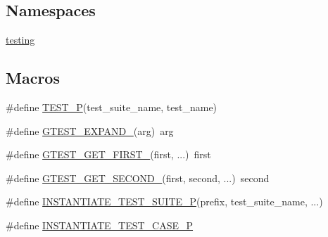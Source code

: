 \subsection*{Namespaces}
\begin{DoxyCompactItemize}
\item 
 \hyperlink{namespacetesting}{testing}
\end{DoxyCompactItemize}
\subsection*{Macros}
\begin{DoxyCompactItemize}
\item 
\#define \hyperlink{gtest-param-test_8h_a1adc861b311e3fbd97bcc72e0b0f5962}{T\+E\+S\+T\+\_\+P}(test\+\_\+suite\+\_\+name,  test\+\_\+name)
\item 
\#define \hyperlink{gtest-param-test_8h_a6442d82c72586da9df3fcfb6d5c80a74}{G\+T\+E\+S\+T\+\_\+\+E\+X\+P\+A\+N\+D\+\_\+}(arg)~arg
\item 
\#define \hyperlink{gtest-param-test_8h_a89cbdb4deb20f050ef09cfee0ee4bc5a}{G\+T\+E\+S\+T\+\_\+\+G\+E\+T\+\_\+\+F\+I\+R\+S\+T\+\_\+}(first, ...)~first
\item 
\#define \hyperlink{gtest-param-test_8h_a8b3f34a83aca320f5fb520e2e0c12b18}{G\+T\+E\+S\+T\+\_\+\+G\+E\+T\+\_\+\+S\+E\+C\+O\+N\+D\+\_\+}(first,  second, ...)~second
\item 
\#define \hyperlink{gtest-param-test_8h_a6a5cb3ce0a0fe17f84f357a6f39a4ba5}{I\+N\+S\+T\+A\+N\+T\+I\+A\+T\+E\+\_\+\+T\+E\+S\+T\+\_\+\+S\+U\+I\+T\+E\+\_\+P}(prefix,  test\+\_\+suite\+\_\+name, ...)
\item 
\#define \hyperlink{gtest-param-test_8h_acc356fe00725fe8bf8b95791c0ffacbd}{I\+N\+S\+T\+A\+N\+T\+I\+A\+T\+E\+\_\+\+T\+E\+S\+T\+\_\+\+C\+A\+S\+E\+\_\+P}
\end{DoxyCompactItemize}
